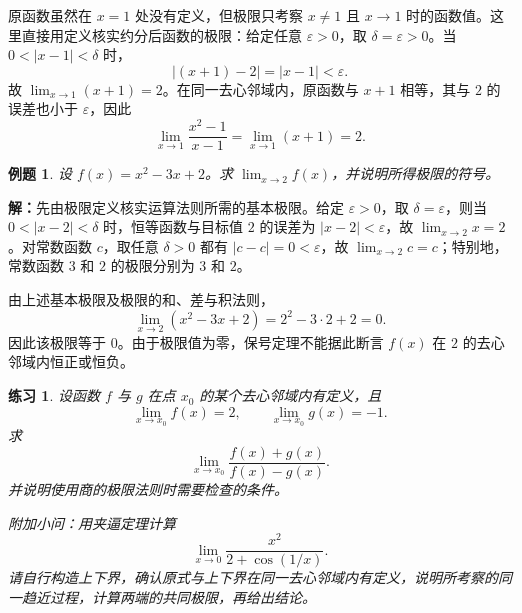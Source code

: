 \documentclass[UTF8,fontset=fandol,11pt]{ctexart}
\newtheorem{example}[definition]{例题}
\newtheorem{exercise}[definition]{练习}
\begin{document}
原函数虽然在 $x=1$ 处没有定义，但极限只考察 $x\neq1$ 且 $x\to1$ 时的函数值。这里直接用定义核实约分后函数的极限：给定任意 $\varepsilon>0$，取 $\delta=\varepsilon>0$。当 $0<|x-1|<\delta$ 时，
\[
|(x+1)-2|=|x-1|<\varepsilon.
\]
故 $\lim_{x\to1}(x+1)=2$。在同一去心邻域内，原函数与 $x+1$ 相等，其与 $2$ 的误差也小于 $\varepsilon$，因此
\[
\lim_{x\to1}\frac{x^2-1}{x-1}=\lim_{x\to1}(x+1)=2.
\]\par
\begin{example}
设 $f(x)=x^2-3x+2$。求 $\lim_{x\to2}f(x)$，并说明所得极限的符号。
\end{example}
\par\noindent\textbf{解：}先由极限定义核实运算法则所需的基本极限。给定 $\varepsilon>0$，取 $\delta=\varepsilon$，则当 $0<|x-2|<\delta$ 时，恒等函数与目标值 $2$ 的误差为 $|x-2|<\varepsilon$，故 $\lim_{x\to2}x=2$。对常数函数 $c$，取任意 $\delta>0$ 都有 $|c-c|=0<\varepsilon$，故 $\lim_{x\to2}c=c$；特别地，常数函数 $3$ 和 $2$ 的极限分别为 $3$ 和 $2$。

由上述基本极限及极限的和、差与积法则，
\[
\lim_{x\to2}(x^2-3x+2)=2^2-3\cdot2+2=0.
\]
因此该极限等于 $0$。由于极限值为零，保号定理不能据此断言 $f(x)$ 在 $2$ 的去心邻域内恒正或恒负。\par
\begin{exercise}
\label{mathagent:exercise:b4c9c9a1fb82bcef052fdbf6e1539831ed88cee016dbcbf83a50e5e8d2311be0}
设函数 $f$ 与 $g$ 在点 $x_0$ 的某个去心邻域内有定义，且
\[
\lim_{x\to x_0}f(x)=2,
\qquad
\lim_{x\to x_0}g(x)=-1.
\]
求
\[
\lim_{x\to x_0}\frac{f(x)+g(x)}{f(x)-g(x)}.
\]
并说明使用商的极限法则时需要检查的条件。

附加小问：用夹逼定理计算
\[
\lim_{x\to0}\frac{x^2}{2+\cos(1/x)}.
\]
请自行构造上下界，确认原式与上下界在同一去心邻域内有定义，说明所考察的同一趋近过程，计算两端的共同极限，再给出结论。
\end{exercise}
\end{document}

